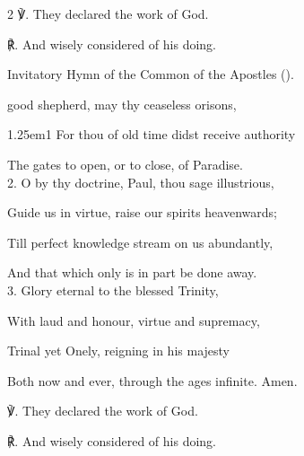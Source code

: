 \begin{paracol}{2}
℣. They declared the work of God.

℟. And wisely considered of his doing.


\switchcolumn

\mattins
{}

\mattinsInvitatoryHymn
\begin{rubric}
	Invitatory Hymn of the Common of the Apostles (\pageref{ApostlesInvitatory}).
\end{rubric}

\mattinsOfficeHymn
{} good shepherd, may thy ceaseless orisons,


\begin{hangparas}{1.25em}{1}
For thou of old time didst receive authority

The gates to open, or to close, of Paradise.\\

2. O by thy doctrine, Paul, thou sage illustrious,

Guide us in virtue, raise our spirits heavenwards;

Till perfect knowledge stream on us abundantly,

And that which only is in part be done away.\\

3. Glory eternal to the blessed Trinity,

With laud and honour, virtue and supremacy,

Trinal yet Onely, reigning in his majesty

Both now and ever, through the ages infinite. Amen.\\
\end{hangparas}

℣. They declared the work of God.

℟. And wisely considered of his doing.



\end{paracol}
